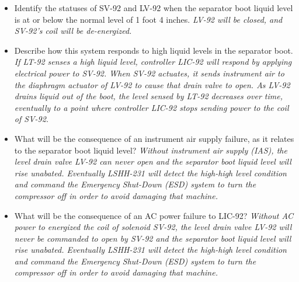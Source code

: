
\begin{itemize}
\item{} Identify the statuses of SV-92 and LV-92 when the separator boot liquid level is at or below the normal level of 1 foot 4 inches.  {\it LV-92 will be closed, and SV-92's coil will be de-energized.}
\vskip 10pt
\item{} Describe how this system responds to high liquid levels in the separator boot.  {\it If LT-92 senses a high liquid level, controller LIC-92 will respond by applying electrical power to SV-92.  When SV-92 actuates, it sends instrument air to the diaphragm actuator of LV-92 to cause that drain valve to open.  As LV-92 drains liquid out of the boot, the level sensed by LT-92 decreases over time, eventually to a point where controller LIC-92 stops sending power to the coil of SV-92.}
\vskip 10pt
\item{} What will be the consequence of an instrument air supply failure, as it relates to the separator boot liquid level?  {\it Without instrument air supply (IAS), the level drain valve LV-92 can never open and the separator boot liquid level will rise unabated.  Eventually LSHH-231 will detect the high-high level condition and command the Emergency Shut-Down (ESD) system to turn the compressor off in order to avoid damaging that machine.}
\vskip 10pt
\item{} What will be the consequence of an AC power failure to LIC-92?  {\it Without AC power to energized the coil of solenoid SV-92, the level drain valve LV-92 will never be commanded to open by SV-92 and the separator boot liquid level will rise unabated.  Eventually LSHH-231 will detect the high-high level condition and command the Emergency Shut-Down (ESD) system to turn the compressor off in order to avoid damaging that machine.}
\end{itemize}












